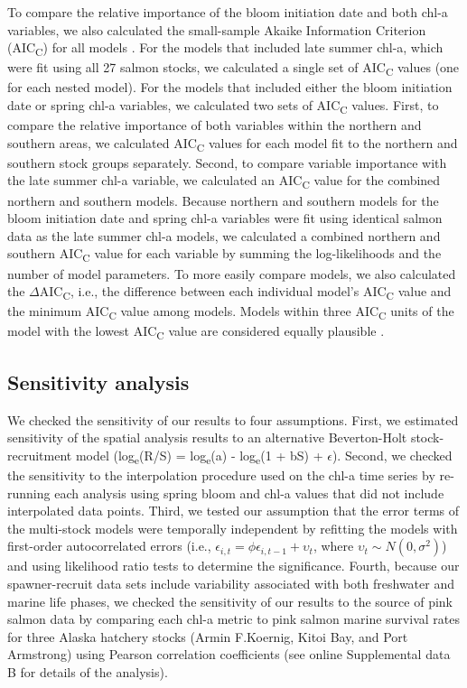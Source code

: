 To compare the relative importance of the bloom initiation date and both chl-a
variables, we also calculated the small-sample Akaike Information Criterion
(AIC\textsubscript{C}) for all models \citep{Hurvich1989a, Burnham2002a}. For
the models that included late summer chl-a, which were fit using all 27 salmon
stocks, we calculated a single set of AIC\textsubscript{C} values (one for each
nested model).  For the models that included either the bloom initiation date or
spring chl-a variables, we calculated two sets of AIC\textsubscript{C} values.
First, to compare the relative importance of both variables within the northern
and southern areas, we calculated AIC\textsubscript{C} values for each model fit
to the northern and southern stock groups separately.  Second, to compare
variable importance with the late summer chl-a variable, we calculated an
AIC\textsubscript{C} value for the combined northern and southern models.
Because northern and southern models for the bloom initiation date and spring
chl-a variables were fit using identical salmon data as the late summer chl-a
models, we calculated a combined northern and southern AIC\textsubscript{C}
value for each variable by summing the log-likelihoods and the number of model
parameters. To more easily compare models, we also calculated the
\(\Delta\)AIC\textsubscript{C}, i.e., the difference between each individual
model's AIC\textsubscript{C} value and the minimum AIC\textsubscript{C} value
among models. Models within three AIC\textsubscript{C} units of the model with
the lowest AIC\textsubscript{C} value are considered equally plausible
\citep{Burnham2002a}.


\subsection{Sensitivity analysis}

We checked the sensitivity of our results to four assumptions. First, we
estimated sensitivity of the spatial analysis results to an alternative
Beverton-Holt stock-recruitment model \citep{Beverton1957a}
(log\textsubscript{e}(R/S) = log\textsubscript{e}(a) - log\textsubscript{e}(1 +
bS) + \(\epsilon\)). Second, we checked the sensitivity to the interpolation
procedure used on the chl-a time series by re-running each analysis using spring
bloom and chl-a values that did not include interpolated data points. Third, we
tested our assumption that the error terms of the multi-stock models were
temporally independent by refitting the models with first-order autocorrelated
errors (i.e., \(\epsilon_{i,t} = \phi\epsilon_{i,t-1} + \upsilon_t\), where
\(\upsilon_t \sim N(0, \sigma^2)\)) and using likelihood ratio tests to
determine the significance. Fourth, because our spawner-recruit data sets
include variability associated with both freshwater and marine life phases, we
checked the sensitivity of our results to the source of pink salmon data by
comparing each chl-a metric to pink salmon marine survival rates for three
Alaska hatchery stocks (Armin F.Koernig, Kitoi Bay, and Port Armstrong) using
Pearson correlation coefficients (see online Supplemental data B for details of
the analysis).


